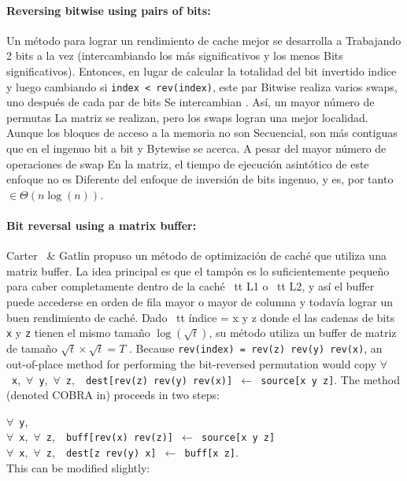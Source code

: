﻿\documentclass[10pt]{article}
\begin{document}
\paragraph{Reversing bitwise using pairs of bits:}
Un método para lograr un rendimiento de cache mejor se desarrolla a
Trabajando 2 bits a la vez (intercambiando los más significativos y los menos
Bits significativos). Entonces, en lugar de calcular la totalidad del bit invertido indice y luego cambiando si {\tt index < rev(index)}, este par
Bitwise realiza varios swaps, uno después de cada par de bits
Se intercambian \cite{perez: place}. Así, un mayor número de permutas
La matriz se realizan, pero los swaps logran una mejor
localidad. Aunque los bloques de acceso a la memoria no son
Secuencial, son más contiguas que en el ingenuo bit a bit y
Bytewise se acerca. A pesar del mayor número de operaciones de swap
En la matriz, el tiempo de ejecución asintótico de este enfoque no es
Diferente del enfoque de inversión de bits ingenuo, y es, por tanto $\in
\Theta (n \log(n))$.
\paragraph{Bit reversal using a matrix buffer:}
Carter \ & Gatlin propuso un método de optimización de caché que utiliza una matriz buffer. La idea principal es que el tampón es lo suficientemente pequeño para caber completamente dentro de la caché {\ tt L1} o {\ tt L2}, y así el buffer puede accederse en orden de fila mayor o mayor de columna y todavía lograr un buen rendimiento de caché. Dado {\ tt índice = x y z} donde el las cadenas de bits {\tt x} y {\tt z} tienen el mismo tamaño $\log(\sqrt{t})$, su método utiliza un buffer de matriz de tamaño $\sqrt{t} \times \sqrt{t} = T$ \cite{carter: towards}.
Because {\tt rev(index) = rev(z) rev(y) rev(x)}, an out-of-place
method for performing the bit-reversed permutation would copy
$\forall$~{\tt x},~$\forall$~{\tt y},~$\forall$~{\tt z},~{\tt
  dest[rev(z)~rev(y)~rev(x)]~$\gets$~source[x~y~z]}. The method
(denoted COBRA in\cite{carter:towards}) proceeds in two steps: 

\noindent $\forall$~{\tt y},\\
\mbox{} \quad $\forall$~{\tt x},~$\forall$~{\tt z},~{\tt
  buff[rev(x)~rev(z)]~$\gets$~source[x~y~z]}\\
\mbox{} \quad $\forall$~{\tt x},~$\forall$~{\tt z},~{\tt
  dest[z~rev(y)~x]~$\gets$~buff[x~z]}.\\

\noindent This can be modified slightly:
\end{document}
